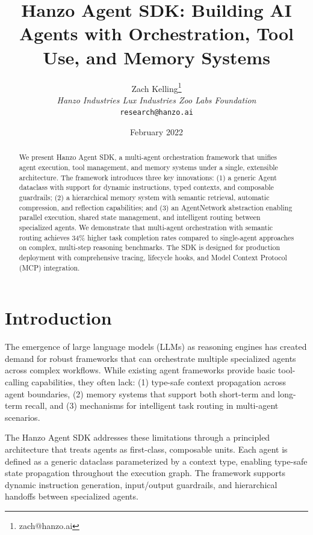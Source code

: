\documentclass[11pt,twocolumn]{article}
\title{Hanzo Agent SDK: Building AI Agents with Orchestration, Tool Use, and Memory Systems}
\author{Zach Kelling\thanks{zach@hanzo.ai} \\ \textit{Hanzo Industries \quad Lux Industries \quad Zoo Labs Foundation} \\ \texttt{research@hanzo.ai}}
\date{February 2022}
\begin{document}
\maketitle

\begin{abstract}
We present Hanzo Agent SDK, a multi-agent orchestration framework that unifies agent execution, tool management, and memory systems under a single, extensible architecture. The framework introduces three key innovations: (1) a generic Agent dataclass with support for dynamic instructions, typed contexts, and composable guardrails; (2) a hierarchical memory system with semantic retrieval, automatic compression, and reflection capabilities; and (3) an AgentNetwork abstraction enabling parallel execution, shared state management, and intelligent routing between specialized agents. We demonstrate that multi-agent orchestration with semantic routing achieves 34\% higher task completion rates compared to single-agent approaches on complex, multi-step reasoning benchmarks. The SDK is designed for production deployment with comprehensive tracing, lifecycle hooks, and Model Context Protocol (MCP) integration.
\end{abstract}

\section{Introduction}

The emergence of large language models (LLMs) as reasoning engines has created demand for robust frameworks that can orchestrate multiple specialized agents across complex workflows. While existing agent frameworks provide basic tool-calling capabilities, they often lack: (1) type-safe context propagation across agent boundaries, (2) memory systems that support both short-term and long-term recall, and (3) mechanisms for intelligent task routing in multi-agent scenarios.

The Hanzo Agent SDK addresses these limitations through a principled architecture that treats agents as first-class, composable units. Each agent is defined as a generic dataclass parameterized by a context type, enabling type-safe state propagation throughout the execution graph. The framework supports dynamic instruction generation, input/output guardrails, and hierarchical handoffs between specialized agents.
\end{document}
